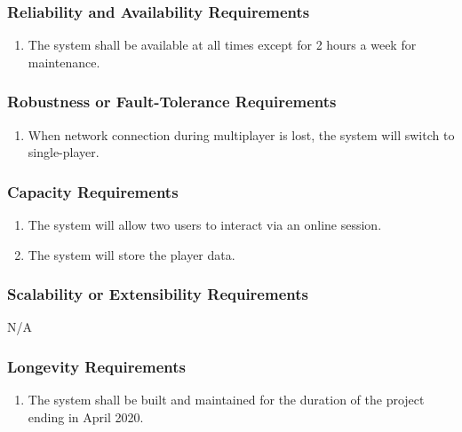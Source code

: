 \documentclass[]{article}
\begin{document}
\subsubsection{Reliability and Availability Requirements}
\label{ssub:reliability_and_availability_requirements}
\begin{enumerate}[start=3, label={PR\arabic*.}]
    \item The system shall be available at all times except for 2 hours a week 
    for maintenance.
\end{enumerate}

\subsubsection{Robustness or Fault-Tolerance Requirements}
\label{ssub:robustness_or_fault_tolerance_requirements}
\begin{enumerate}[start=4, label={PR\arabic*.}]
    \item When network connection during multiplayer is lost, the system will 
    switch to single-player.
\end{enumerate}

\subsubsection{Capacity Requirements}
\label{ssub:capacity_requirements}
\begin{enumerate}[start=5, label={PR\arabic*.}]
	\item The system will allow two users to interact via an online session.
	\item The system will store the player data.
\end{enumerate}

\subsubsection{Scalability or Extensibility Requirements}
\label{ssub:scalability_or_extensibility_requirements}
N/A

\subsubsection{Longevity Requirements}
\label{ssub:longevity_requirements}
\begin{enumerate}[start=7, label={PR\arabic*.}]
    \item The system shall be built and maintained for the duration of the 
    project ending in April 2020.
\end{enumerate}
\end{document}
